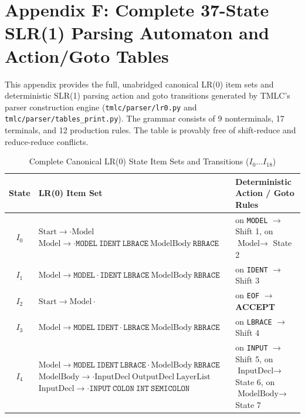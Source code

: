 \documentclass[11pt,a4paper]{article}
\begin{document}
\newpage
\section{Appendix F: Complete 37-State SLR(1) Parsing Automaton and Action/Goto Tables}
\label{app:full_slr_tables}

This appendix provides the full, unabridged canonical LR(0) item sets and deterministic SLR(1) parsing action and goto transitions generated by TMLC's parser construction engine (\texttt{tmlc/parser/lr0.py} and \texttt{tmlc/parser/tables\_print.py}). The grammar consists of 9 nonterminals, 17 terminals, and 12 production rules. The table is provably free of shift-reduce and reduce-reduce conflicts.

\begin{table}[htbp]
\centering
\scriptsize
\caption{Complete Canonical LR(0) State Item Sets and Transitions ($I_0 \dots I_{18}$)}
\label{tab:canonical_states_part1}
\begin{tabular}{cp{6.5cm}p{5.5cm}}
\toprule
\textbf{State} & \textbf{LR(0) Item Set} & \textbf{Deterministic Action / Goto Rules} \\
\midrule
$I_0$  & $\text{Start} \rightarrow \cdot \text{Model}$ \newline $\text{Model} \rightarrow \cdot \texttt{MODEL} \ \texttt{IDENT} \ \texttt{LBRACE} \ \text{ModelBody} \ \texttt{RBRACE}$ & on \texttt{MODEL} $\rightarrow$ Shift 1, on $\text{Model} \rightarrow$ State 2 \\
$I_1$  & $\text{Model} \rightarrow \texttt{MODEL} \cdot \texttt{IDENT} \ \texttt{LBRACE} \ \text{ModelBody} \ \texttt{RBRACE}$ & on \texttt{IDENT} $\rightarrow$ Shift 3 \\
$I_2$  & $\text{Start} \rightarrow \text{Model} \cdot$ & on \texttt{EOF} $\rightarrow$ \textbf{ACCEPT} \\
$I_3$  & $\text{Model} \rightarrow \texttt{MODEL} \ \texttt{IDENT} \cdot \texttt{LBRACE} \ \text{ModelBody} \ \texttt{RBRACE}$ & on \texttt{LBRACE} $\rightarrow$ Shift 4 \\
$I_4$  & $\text{Model} \rightarrow \texttt{MODEL} \ \texttt{IDENT} \ \texttt{LBRACE} \cdot \text{ModelBody} \ \texttt{RBRACE}$ \newline $\text{ModelBody} \rightarrow \cdot \text{InputDecl} \ \text{OutputDecl} \ \text{LayerList}$ \newline $\text{InputDecl} \rightarrow \cdot \texttt{INPUT} \ \texttt{COLON} \ \texttt{INT} \ \texttt{SEMICOLON}$ & on \texttt{INPUT} $\rightarrow$ Shift 5, on $\text{InputDecl} \rightarrow$ State 6, on $\text{ModelBody} \rightarrow$ State 7 \\

\end{tabular}
\end{table}
\end{document}
